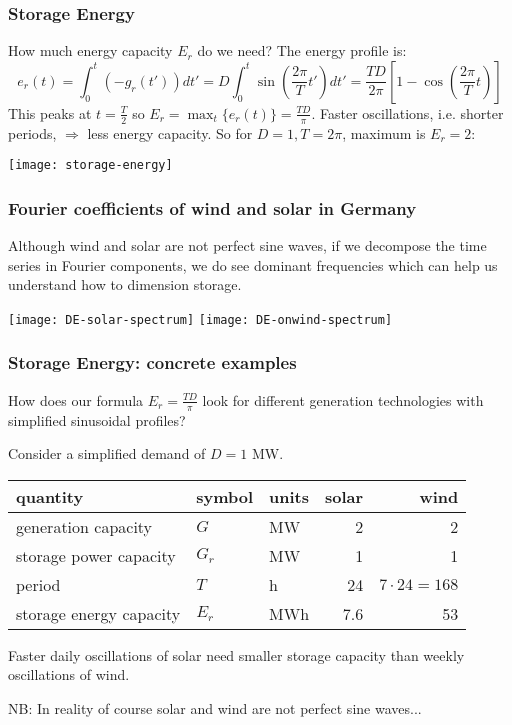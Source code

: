 \documentclass[10pt,aspectratio=169,dvipsnames]{beamer}
\newcommand{\ra}[1]{\renewcommand{\arraystretch}{#1}}
\begin{document}
\begin{frame}
  \frametitle{Storage Energy}

  How much energy capacity $E_{r}$ do we need? The energy profile is:
  \begin{equation*}
    e_r(t) = \int_{0}^{t} (-g_r(t')) dt' = D \int_0^t \sin\left(\frac{2\pi}{T} t'\right) dt' =  \frac{TD}{2\pi}\left[ 1 - \cos\left(\frac{2\pi}{T} t\right)\right]
  \end{equation*}
  This peaks at $t=\frac{T}{2}$  so $E_r = \max_t\{e_r(t)\} = \frac{TD}{\pi}$. Faster oscillations, i.e. shorter periods, $\Rightarrow$ less energy capacity. So for $D =1, T = 2\pi$, maximum is $E_r = 2$:

  \centering
  \texttt{[image: storage-energy]}

\end{frame}



\begin{frame}
  \frametitle{Fourier coefficients of wind and solar in Germany}

  Although wind and solar are not perfect sine waves, if we decompose
  the time series in Fourier components, we do see \alert{dominant
    frequencies} which can help us understand how to dimension
  storage.

  \vspace{1cm}

  \texttt{[image: DE-solar-spectrum]}
  \texttt{[image: DE-onwind-spectrum]}


\end{frame}


\begin{frame}
  \frametitle{Storage Energy: concrete examples}

  How does our formula $E_r = \frac{TD}{\pi}$ look for different
  generation technologies with simplified sinusoidal profiles?

  Consider a simplified demand of $D = 1$ MW.
  \ra{1.05}
  \begin{table}[!t]
    \begin{tabular}{lllrr}
      \toprule
      quantity & symbol & units & solar & wind\\
      \midrule
      generation capacity &$G$ & MW & 2 & 2 \\
      storage power capacity & $G_r$ & MW & 1 & 1 \\
      period & $T$ & h & 24 & $7 \cdot 24 = 168$\\
      storage energy capacity & $E_r$ & MWh & 7.6 &  53 \\
      \bottomrule
    \end{tabular}
  \end{table}
  Faster daily oscillations of solar need smaller storage capacity than weekly oscillations of wind.

  NB: In reality of course solar and wind are not perfect sine waves...
\end{frame}
\end{document}
